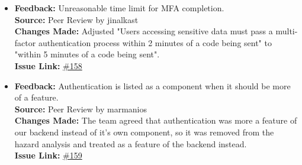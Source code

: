 \documentclass{article}
\begin{document}
\begin{itemize}
      \item 
      \textbf{Feedback:} Unreasonable time limit for MFA completion. \\
      \textbf{Source:} Peer Review by jinalkast \\
      \textbf{Changes Made:} Adjusted "Users accessing sensitive data must pass a multi-factor authentication process within 2 minutes of a code being sent" to "within 5 minutes of a code being sent". \\
      \textbf{Issue Link:} \href{https://github.com/parishanizam/TeleHealth/issues/158}{\#158}

      \item 
      \textbf{Feedback:} Authentication is listed as a component when it should be more of a feature. \\
      \textbf{Source:} Peer Review by marmanios \\
      \textbf{Changes Made:} The team agreed that authentication was more a feature of our backend instead of it's own component, so it was removed from the hazard analysis and treated as a feature of the backend instead. \\
      \textbf{Issue Link:} \href{https://github.com/parishanizam/TeleHealth/issues/159}{\#159}

\end{itemize}

\newpage
\end{document}
